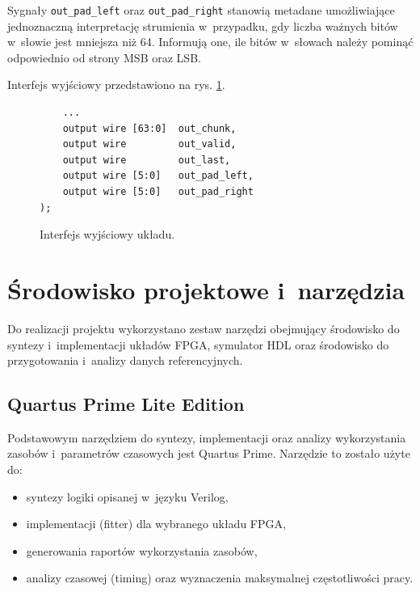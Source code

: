 Sygnały \texttt{out\_pad\_left} oraz \texttt{out\_pad\_right} stanowią metadane umożliwiające jednoznaczną interpretację strumienia w~przypadku, gdy liczba ważnych bitów w~słowie jest mniejsza niż 64. Informują one, ile bitów w~słowach należy pominąć odpowiednio od strony MSB oraz LSB.

Interfejs wyjściowy przedstawiono na rys. \ref{fig:pdschtx_if_out}.

\begin{figure}[!ht]
\centering
\begin{minipage}{0.95\linewidth}
\begin{lstlisting}
    ...
    output wire [63:0]  out_chunk,
    output wire         out_valid,
    output wire         out_last,
    output wire [5:0]   out_pad_left,
    output wire [5:0]   out_pad_right
);
\end{lstlisting}
\end{minipage}
\caption{Interfejs wyjściowy układu.}
\label{fig:pdschtx_if_out}
\end{figure}


\section{Środowisko projektowe i~narzędzia}
\label{sec:srodowisko_i_narzedzia}

Do realizacji projektu wykorzystano zestaw narzędzi obejmujący środowisko do syntezy i~implementacji układów FPGA, symulator HDL oraz środowisko do przygotowania i~analizy danych referencyjnych.

\subsection{Quartus Prime Lite Edition}
Podstawowym narzędziem do syntezy, implementacji oraz analizy wykorzystania zasobów i~parametrów czasowych jest Quartus Prime. Narzędzie to zostało użyte do:
\begin{itemize}
    \item syntezy logiki opisanej w~języku Verilog,
    \item implementacji (fitter) dla wybranego układu FPGA,
    \item generowania raportów wykorzystania zasobów,
    \item analizy czasowej (timing) oraz wyznaczenia maksymalnej częstotliwości pracy.
\end{itemize}

